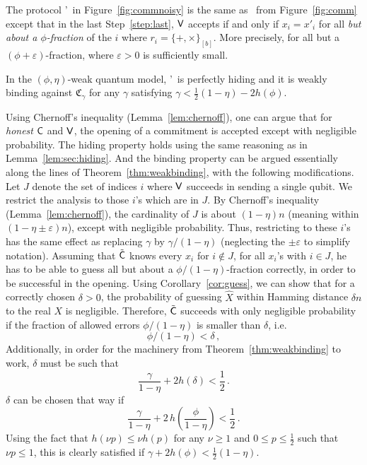 The protocol \comm'\ in Figure~\ref{fig:commnoisy} is the same as
\comm\ from Figure~\ref{fig:comm} except that in the last
Step~\ref{step:last}, ${\sf V}$ accepts if and only if $x_i = x'_i$ for all
{\em but about a $\phi$-fraction} of the $i$ where $r_i = \{+,\times
\}_{[b]}$. More precisely, for all but a
$(\phi+\varepsilon)$-fraction, where $\varepsilon > 0$ is sufficiently
small.
\begin{theorem}\label{thm:weakcommsec}
  In the $(\phi,\eta)$-weak quantum model, \comm'\ is perfectly hiding
  and it is weakly binding against $\mathfrak{C}_{\gamma}$ for any $\gamma$
  satisfying $\gamma < \frac{1}{2}(1-\eta) - 2 h(\phi)$.
\end{theorem}
\begin{sketch} %
  Using  Chernoff's inequality (Lemma~\ref{lem:chernoff}), one can
  argue that for {\em honest} ${\sf C}$ and ${\sf V}$, the opening of a
  commitment is accepted except with negligible probability.  The
  hiding property holds using the same reasoning as in
  Lemma~\ref{lem:sec:hiding}. And the binding property can be argued
  essentially along the lines of Theorem~\ref{thm:weakbinding}, with
  the following modifications. Let $J$ denote the set of indices $i$
  where ${\sf V}$ succeeds in sending a single qubit. We restrict the
  analysis to those $i$'s which are in $J$. By 
   Chernoff's inequality
  (Lemma~\ref{lem:chernoff}), the cardinality of $J$ is about
  $(1-\eta)n$ (meaning within $(1-\eta\pm \varepsilon)n$), except with
  negligible probability.  Thus, restricting to these $i$'s has the
  same effect as replacing $\gamma$ by $\gamma/(1-\eta)$ (neglecting
  the $\pm \varepsilon$ to simplify notation). Assuming that $\tilde{\sf C}$
  knows every $x_i$ for $i \not\in J$, for all $x_i$'s with $i \in J$,
  he has to be able to guess all but about a $\phi/(1-\eta)$-fraction
  correctly, in order to be successful in the opening. Using
  Corollary~\ref{cor:guess}, we can show that for a correctly chosen
  $\delta >0$, the probability of guessing $\hat{X}$ within Hamming
  distance $\delta n$ to the real $X$ is negligible. Therefore, $\tilde{\sf C}$
  succeeds with only negligible probability if the fraction of allowed
  errors $\phi/(1-\eta)$ is smaller than $\delta$, i.e.
$$
\phi/(1-\eta) < \delta \, ,$$ 
Additionally, in order for the machinery from Theorem~\ref{thm:weakbinding} to work, $\delta$ must be such that 
$$ \frac{\gamma}{1-\eta} + 2h(\delta) < \frac{1}{2} \, .
$$ 
$\delta$ can be chosen that way if 
$$
\frac{\gamma}{1-\eta} + 2 \, h\!\left( \frac{\phi}{1-\eta} \right) < \frac{1}{2} \, .
$$
Using the fact that $h(\nu p) \leq \nu h(p)$ for any $\nu \geq 1$
and $0 \leq p \leq \frac12$ such that $\nu p \leq 1$, this is clearly
satisfied if
$\gamma + 2 h(\phi) < \frac{1}{2}(1-\eta)$. 
\end{sketch}


